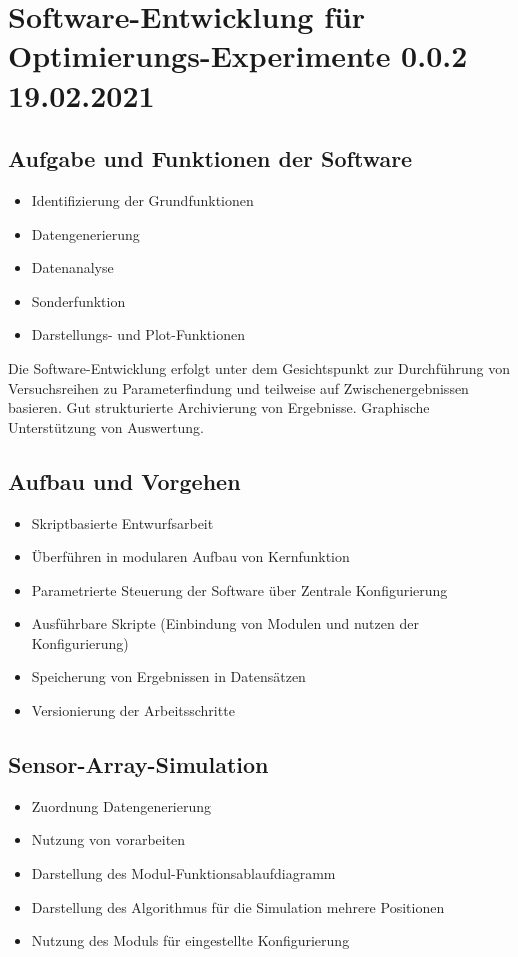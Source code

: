 %

\chapter{Software-Entwicklung für Optimierungs-Experimente 0.0.2 19.02.2021}\label{ch:sw-entwicklung-f-opt-exp}

\section{Aufgabe und Funktionen der Software}\label{sec:aufgabe-und-funktionen-sw}
\begin{itemize}
	\item Identifizierung der Grundfunktionen
	\item Datengenerierung
	\item Datenanalyse
	\item Sonderfunktion
	\item Darstellungs- und Plot-Funktionen
\end{itemize}

Die Software-Entwicklung erfolgt unter dem Gesichtspunkt zur Durchführung von Versuchsreihen zu 
Parameterfindung und teilweise auf Zwischenergebnissen basieren.
Gut strukturierte Archivierung von Ergebnisse.
Graphische Unterstützung von Auswertung.
 
\section{Aufbau und Vorgehen}\label{sec:aufbau-und-vorgehen}
	\begin{itemize}
		\item Skriptbasierte Entwurfsarbeit
		\item Überführen in modularen Aufbau von Kernfunktion
		\item Parametrierte Steuerung der Software über Zentrale Konfigurierung
		\item Ausführbare Skripte (Einbindung von Modulen und nutzen der Konfigurierung)
		\item Speicherung von Ergebnissen in Datensätzen
		\item Versionierung der Arbeitsschritte
	\end{itemize}


\section{Sensor-Array-Simulation}\label{sec:sensor-array-simulation}
	\begin{itemize}
		\item Zuordnung Datengenerierung
		\item Nutzung von vorarbeiten
		\item Darstellung des Modul-Funktionsablaufdiagramm
		\item Darstellung des Algorithmus für die Simulation mehrere Positionen
		\item Nutzung des Moduls für eingestellte Konfigurierung
	\end{itemize}

